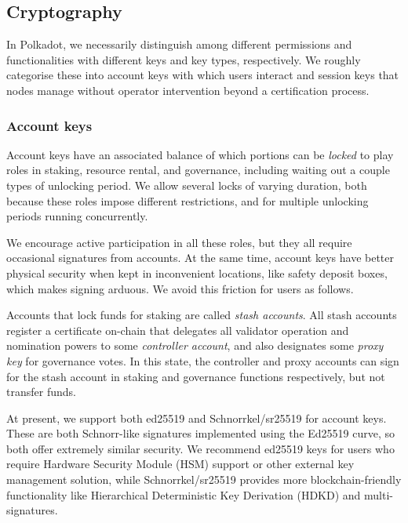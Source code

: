 \documentclass{article}
\begin{document}
\subsection{Cryptography}\label{sec:crypto}

In Polkadot, we necessarily distinguish among different permissions and functionalities with different keys and key types, respectively.  We roughly categorise these into account keys with which users interact and session keys that nodes manage without operator intervention beyond a certification process.

\subsubsection{Account keys}

Account keys have an associated balance of which portions can be {\em locked} to play roles in staking, resource rental, and governance, including waiting out a couple types of unlocking period.  We allow several locks of varying duration, both because these roles impose different restrictions, and for multiple unlocking periods running concurrently. 

We encourage active participation in all these roles, but they all require occasional signatures from accounts.  At the same time, account keys have better physical security when kept in inconvenient locations, like safety deposit boxes, which makes signing arduous.  We avoid this friction for users as follows.

Accounts that lock funds for staking are called {\em stash accounts}.  All stash accounts register a certificate on-chain that delegates all validator operation and nomination powers to some {\em controller account}, and also designates some {\em proxy key} for governance votes.  In this state, the controller and proxy accounts can sign for the stash account in staking and governance functions respectively, but not transfer funds.  

\smallskip

At present, we support both ed25519 \cite{ed25519} and Schnorrkel/sr25519 \cite{schnorrkel} for account keys.  These are both Schnorr-like signatures implemented using the Ed25519 curve, so both offer extremely similar security.  We recommend ed25519 keys for users who require Hardware Security Module (HSM) support or other external key management solution, while Schnorrkel/sr25519 provides more blockchain-friendly functionality like Hierarchical Deterministic Key Derivation (HDKD) and multi-signatures.  
\end{document}
